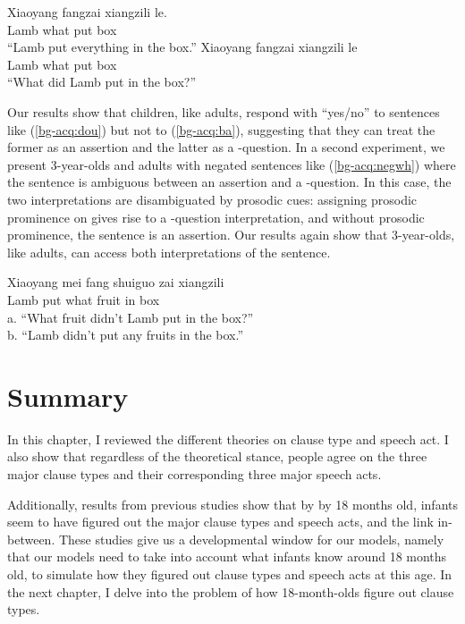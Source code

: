 	
\gll Xiaoyang 	 	 	fangzai 	xiangzili 	le.\\
Lamb	what	\Dou{}	put 	box		\Asp{}\\
``Lamb put everything in the box.''
\eex
{}
\gll Xiaoyang	  	fangzai 	xiangzili 	le\\
	Lamb		what	put	box		\Asp{}\\
	``What did Lamb put in the box?''
\eex


Our results show that children, like adults, respond with ``yes/no'' to sentences like (\ref{bg-acq:dou}) but not to (\ref{bg-acq:ba}), suggesting that they can treat the former as an assertion and the latter as a \twh-question. In a second experiment, we present 3-year-olds and adults with negated sentences like (\ref{bg-acq:negwh}) where the sentence is ambiguous between an assertion and a \twh-question. In this case, the two interpretations are disambiguated by prosodic cues: assigning prosodic prominence on  gives rise to a \twh-question interpretation, and without prosodic prominence, the sentence is an assertion. Our results again show that 3-year-olds, like adults, can access both interpretations of the sentence.


\gll Xiaoyang mei	fang	 shuiguo zai	xiangzili\\
Lamb \Neg{}	put	what		fruit		in	box\\
\trans a. ``What fruit didn't Lamb put in the box?''\\
b.	``Lamb didn't put any fruits in the box.''
\eex

\section{Summary}
In this chapter, I reviewed the different theories on clause type and speech act. I also show that regardless of the theoretical stance, people agree on the three major clause types and their corresponding three major speech acts. 

Additionally, results from previous studies show that by by 18 months old, infants seem to have figured out the major clause types and speech acts, and the link in-between. These studies give us a developmental window for our models, namely that our models need to take into account what infants know around 18 months old, to simulate how they figured out clause types and speech acts at this age. In the next chapter, I delve into the problem of how 18-month-olds figure out clause types.


